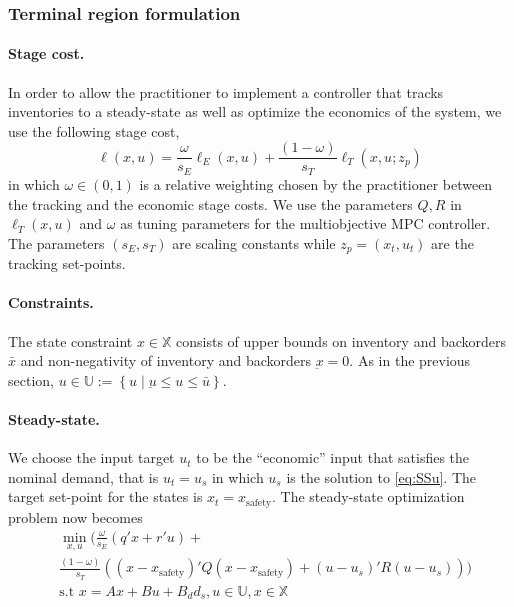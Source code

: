 \documentclass[10pt]{article}
\newcommand{\set}[1]{\left\lbrace #1 \right\rbrace}
\theoremstyle{definition}
\begin{document}
\subsubsection{Terminal region formulation}
\paragraph{Stage cost.} In order to allow the practitioner to implement
a controller that tracks inventories to a steady-state as well as
optimize the economics of the system, we use the following stage cost,
\begin{equation}
\label{eq:ell}
\ell(x,u) = \frac{\omega}{s_E} \ell_E(x,u) + \frac{(1-\omega)}{s_T} \ell_T(x,u;z_p)
\end{equation}
in which $\omega \in (0,1)$ is a relative weighting chosen by the
practitioner between the tracking and the economic stage costs. We use
the parameters $Q,R$ in $\ell_T(x,u)$ and $\omega$ as tuning
parameters for the multiobjective MPC controller. The parameters
$(s_E,s_T)$ are scaling constants while $z_p=(x_t,u_t)$ are the tracking
set-points.
\paragraph{Constraints.} The state constraint $x \in
\mathbb{X}$ consists of upper bounds on inventory and backorders
$\bar{x}$ and non-negativity of inventory and backorders
$\underbar{x}=0$. As in the previous section,  $ u \in \mathbb{U} := \set{u \mid \underbar{u} \leq
  u \leq \bar{u}}$.



\paragraph{Steady-state.}
We choose the input target $u_t$ to be the ``economic'' input that
satisfies the nominal demand, that is $u_t = u_s$ in which $u_s$ is
the solution to \eqref{eq:SSu}. The target set-point for the states is
$x_t = x_{\text{safety}}$. The steady-state optimization problem
now becomes
\begin{align}
\label{eq:SSMulti}
&\min_{x,u}{}(\frac{\omega}{s_E} (q'x+r'u) + \nonumber\\
&\frac{(1-\omega)}{s_T}((x-x_{\text{safety}})'Q(x-x_{\text{safety}})+(u-u_s)'R(u-u_s)))\\
&\text{s.t~} x=Ax+Bu+B_dd_s, u \in \mathbb{U}, x \in \mathbb{X} \nonumber\\
\end{align}
\end{document}
